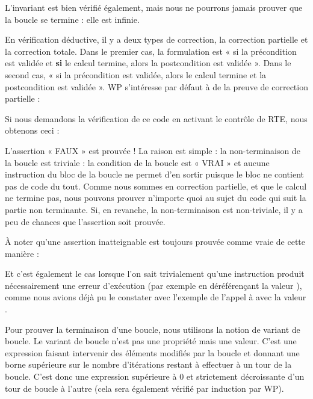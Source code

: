 L'invariant est bien vérifié également, mais nous ne pourrons jamais prouver
que la boucle se termine : elle est infinie.





En vérification déductive, il y a deux types de correction, la correction 
partielle et la correction totale. Dans le premier cas, la formulation est 
« si la précondition est validée et \textbf{si} le calcul termine, alors la 
postcondition est validée ». Dans le second cas, « si la précondition est 
validée, alors le calcul termine et la postcondition est validée ». WP 
s'intéresse par défaut à de la preuve de correction partielle :





Si nous demandons la vérification de ce code en activant le contrôle de RTE,
nous obtenons ceci :





L'assertion « FAUX » est prouvée ! La raison est simple : la non-terminaison de
la boucle est triviale : la condition de la boucle est « VRAI » et aucune instruction
du bloc de la boucle ne permet d'en sortir puisque le bloc ne contient pas de code du
tout. Comme nous sommes en correction partielle, et que le calcul ne termine pas, nous
pouvons prouver n'importe quoi au sujet du code qui suit la partie non terminante. Si,
en revanche, la non-terminaison est non-triviale, il y a peu de chances que l'assertion
soit prouvée.



\begin{Information}
À noter qu'une assertion inatteignable est toujours prouvée comme vraie de cette 
manière :

Et c'est également le cas lorsque l'on sait trivialement qu'une instruction
produit nécessairement une erreur d'exécution (par exemple en déréférençant 
la valeur ), comme nous avions déjà pu le constater avec l'exemple
de l'appel à  avec la valeur .
\end{Information}


Pour prouver la terminaison d'une boucle, nous utilisons la notion de variant de 
boucle. Le variant de boucle n'est pas une propriété mais une valeur. C'est une 
expression faisant intervenir des éléments modifiés par la boucle et donnant une
borne supérieure sur le nombre d'itérations restant à effectuer à un tour de la
boucle. C'est donc une expression supérieure à 0 et strictement décroissante d'un 
tour de boucle à l'autre (cela sera également vérifié par induction par WP).



